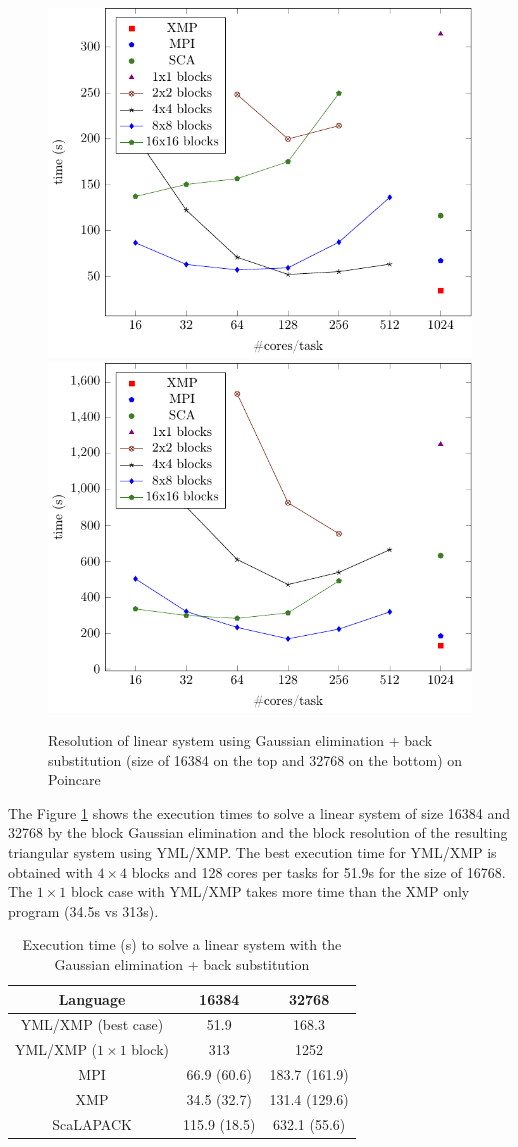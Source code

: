 \begin{figure}
	\caption{Resolution of linear system using Gaussian elimination + back substitution (size of 16384 on the top and 32768 on the bottom) on Poincare\label{fig:g1}}
	\centering
	\includegraphics[width=.49\textwidth]{fig-g-16k.pdf}
	\includegraphics[width=.49\textwidth]{fig-g-32k.pdf}
\end{figure}

The Figure \ref{fig:g1} shows the execution times to solve a linear system of size 16384 and 32768 by the block Gaussian elimination and the block resolution of the resulting triangular system using YML/XMP.
The best execution time for YML/XMP is obtained with $4 \times 4$ blocks and 128 cores per tasks for 51.9s for the size of 16768.
The $1 \times 1$ block case with YML/XMP takes more time than the XMP only program (34.5s vs 313s).

\begin{table}
	\caption{Execution time (s) to solve a linear system with the Gaussian elimination + back substitution\label{tab:best_time}}
	\centering
	\begin{tabular}{ccc}
		\hline
         Language           &    16384     &     32768     \\ \hline
   YML/XMP (best case)      &     51.9     &     168.3     \\
		YML/XMP ($1 \times 1$ block) &     313      &     1252      \\
           MPI              & 66.9 (60.6)  & 183.7 (161.9) \\
           XMP              & 34.5 (32.7)  & 131.4 (129.6) \\
        ScaLAPACK           & 115.9 (18.5) & 632.1 (55.6)  \\ \hline
	\end{tabular}
\end{table}


